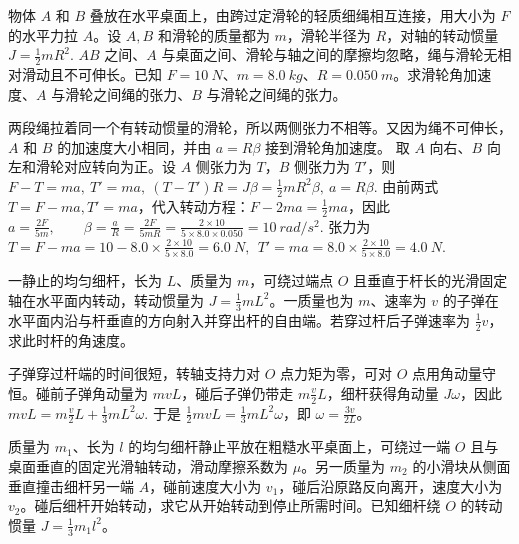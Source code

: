 \begin{exercise}
物体 \(A\) 和 \(B\) 叠放在水平桌面上，由跨过定滑轮的轻质细绳相互连接，用大小为 \(F\) 的水平力拉 \(A\)。设 \(A,B\) 和滑轮的质量都为 \(m\)，滑轮半径为 \(R\)，对轴的转动惯量
 \(J=\frac12mR^2.\) 
\(AB\) 之间、\(A\) 与桌面之间、滑轮与轴之间的摩擦均忽略，绳与滑轮无相对滑动且不可伸长。已知 \(F=\SI{10}{N}\)、\(m=\SI{8.0}{kg}\)、\(R=\SI{0.050}{m}\)。求滑轮角加速度、\(A\) 与滑轮之间绳的张力、\(B\) 与滑轮之间绳的张力。
\end{exercise}
\begin{solution}
两段绳拉着同一个有转动惯量的滑轮，所以两侧张力不相等。又因为绳不可伸长，\(A\) 和 \(B\) 的加速度大小相同，并由 \(a=R\beta\) 接到滑轮角加速度。
 取 \(A\) 向右、\(B\) 向左和滑轮对应转向为正。设 \(A\) 侧张力为 \(T\)，\(B\) 侧张力为 \(T'\)，则
 \(F-T=ma,~ T'=ma,~ (T-T')R=J\beta=\frac12mR^2\beta,~ a=R\beta.\) 
由前两式$T=F-ma, T'=ma$，代入转动方程：$F-2ma=\frac12m a$，因此
 \(a=\frac{2F}{5m},\qquad \beta=\frac{a}{R}=\frac{2F}{5mR}=\frac{2\times10}{5\times8.0\times0.050} =\SI{10}{rad/s^2}.\) 
张力为
 \(T=F-ma=10-8.0\times\frac{2\times10}{5\times8.0} =\SI{6.0}{N},~~ T'=ma=8.0\times\frac{2\times10}{5\times8.0} =\SI{4.0}{N}.\) 
\end{solution}


\begin{exercise}
一静止的均匀细杆，长为 \(L\)、质量为 \(m\)，可绕过端点 \(O\) 且垂直于杆长的光滑固定轴在水平面内转动，转动惯量为 \(J=\frac13mL^2\)。一质量也为 \(m\)、速率为 \(v\) 的子弹在水平面内沿与杆垂直的方向射入并穿出杆的自由端。若穿过杆后子弹速率为 \(\frac12v\)，求此时杆的角速度。
\end{exercise}

\begin{solution}
子弹穿过杆端的时间很短，转轴支持力对 \(O\) 点力矩为零，可对 \(O\) 点用角动量守恒。碰前子弹角动量为 \(mvL\)，碰后子弹仍带走 \(m\frac{v}{2}L\)，细杆获得角动量 \(J\omega\)，因此
 \(mvL=m\frac{v}{2}L+\frac13mL^2\omega.\) 
于是 \(\frac12mvL=\frac13mL^2\omega\)，即 \(\omega=\frac{3v}{2L}\)。
\end{solution}

\begin{exercise}
质量为 \(m_1\)、长为 \(l\) 的均匀细杆静止平放在粗糙水平桌面上，可绕过一端 \(O\) 且与桌面垂直的固定光滑轴转动，滑动摩擦系数为 \(\mu\)。另一质量为 \(m_2\) 的小滑块从侧面垂直撞击细杆另一端 \(A\)，碰前速度大小为 \(v_1\)，碰后沿原路反向离开，速度大小为 \(v_2\)。碰后细杆开始转动，求它从开始转动到停止所需时间。已知细杆绕 \(O\) 的转动惯量 \(J=\frac13m_1l^2\)。
\end{exercise}

